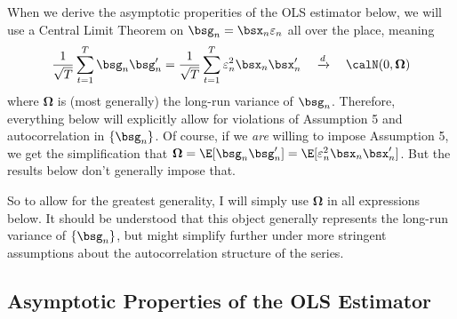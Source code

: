 \documentclass[12pt]{article}
\theoremstyle{plain}
\theoremstyle{definition}
\theoremstyle{remark}
\newcommand{\bsOmega}{\boldsymbol{\Omega}}
\newcommand{\dto}{\xrightarrow{d}}
\newcommand{\sumtT}{\sum^T_{t=1}}
\begin{document}
When we derive the asymptotic properities of the OLS estimator below, we
will use a Central Limit Theorem on $\bsg_n=\bsx_n\varepsilon_n$ all
over the place, meaning
\begin{align*}
  \frac{1}{\sqrt{T}}\sumtT \bsg_n\bsg_n'
  = \frac{1}{\sqrt{T}}\sumtT \varepsilon_n^2\bsx_n\bsx_n'
  \quad\dto\quad \calN(0,\bsOmega)
\end{align*}
where $\bsOmega$ is (most generally) the long-run variance of $\bsg_n$.
Therefore, everything below will explicitly allow for violations of
Assumption 5 and autocorrelation in $\{\bsg_n\}$. Of course, if we
\emph{are} willing to impose Assumption 5, we get the simplification
that $\bsOmega=\E[\bsg_n\bsg_n']=\E[\varepsilon_n^2\bsx_n\bsx_n']$.
But the results below don't generally impose that.

So to allow for the greatest generality, I will simply use $\bsOmega$
in all expressions below. It should be understood that this object
generally represents the long-run variance of $\{\bsg_n\}$, but might
simplify further under more stringent assumptions about the
autocorrelation structure of the series.


\clearpage
\subsection{Asymptotic Properties of the OLS Estimator}
\end{document}
